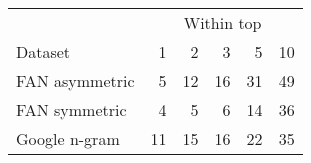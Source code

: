 \begin{tabular}{lrrrrr}\toprule
& \multicolumn{5}{c}{Within top} \\
\cmidrule{2-6}
Dataset & 1 & 2 & 3 & 5 & 10 \\
\hline
FAN asymmetric & 5 & 12 & 16 & 31 & 49 \\
FAN symmetric & 4 & 5 & 6 & 14 & 36 \\
Google n-gram & 11 & 15 & 16 & 22 & 35 \\
\bottomrule
\end{tabular}
